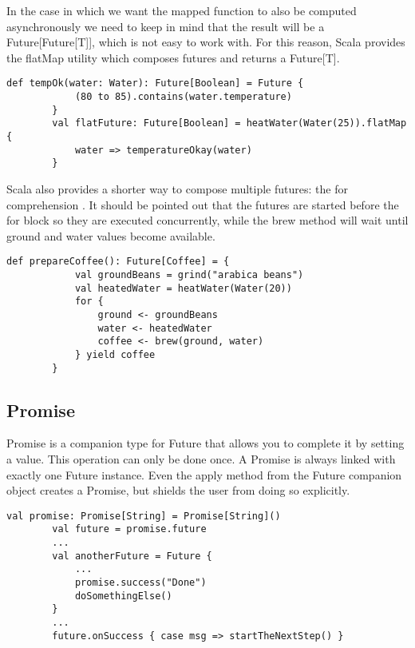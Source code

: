 \documentclass[12pt]{article}
\begin{document}
	In the case in which we want the mapped function to also be computed asynchronously we need 
	to keep in mind that the result will be a Future[Future[T]], which is not easy to work with. 
	For this reason, Scala provides the flatMap utility which composes futures and returns a Future[T].

	\begin{lstlisting}[style=myScalastyle, caption={FlatMapping future}, label={flatMapFuture}]
		def tempOk(water: Water): Future[Boolean] = Future {
			(80 to 85).contains(water.temperature)
		}
		val flatFuture: Future[Boolean] = heatWater(Water(25)).flatMap {
			water => temperatureOkay(water)
		}
	\end{lstlisting}

	Scala also provides a shorter way to compose multiple futures: the for comprehension 
	\cite{FuturePromiseNeophyte}.
	It should be pointed out that the futures are started before the for block so they are executed 
	concurrently, while the brew method will wait until ground and water values become available.

	\begin{lstlisting}[style=myScalastyle, caption={For comprehensions}, label={forComp}]
		def prepareCoffee(): Future[Coffee] = {
			val groundBeans = grind("arabica beans")
			val heatedWater = heatWater(Water(20))
			for {
				ground <- groundBeans
				water <- heatedWater
				coffee <- brew(ground, water)
			} yield coffee
		}
	\end{lstlisting}

	\subsection{Promise}
	Promise is a companion type for Future that allows you to complete it by setting a value\cite{FuturePromiseNeophyte}.
	This operation can only be done once. A Promise is always linked with exactly one Future instance.
	Even the apply method from the Future companion object creates a Promise, but shields the user 
	from doing so explicitly.

	\begin{lstlisting}[style=myScalastyle, caption={Promise example}, label={promise}]
		val promise: Promise[String] = Promise[String]()
		val future = promise.future 
		...
		val anotherFuture = Future {
			...
			promise.success("Done")
			doSomethingElse()
		}
		...
		future.onSuccess { case msg => startTheNextStep() }
	\end{lstlisting}
\end{document}
